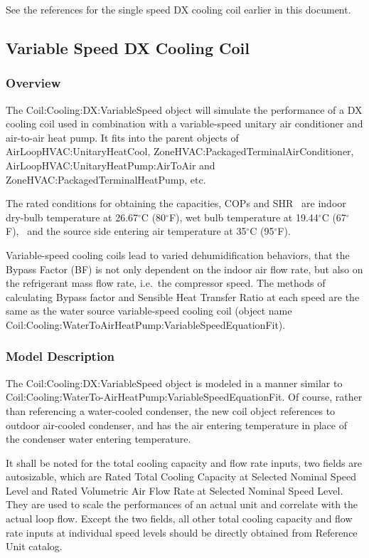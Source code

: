 See the references for the single speed DX cooling coil earlier in this document.

\subsection{Variable Speed DX Cooling Coil}\label{variable-speed-dx-cooling-coil}

\subsubsection{Overview}\label{overview-4-002}

The Coil:Cooling:DX:VariableSpeed object will simulate the performance of a DX cooling coil used in combination with a variable-speed unitary air conditioner and air-to-air heat pump. It fits into the parent objects of AirLoopHVAC:UnitaryHeatCool, ZoneHVAC:PackagedTerminalAirConditioner, AirLoopHVAC:UnitaryHeatPump:AirToAir and ZoneHVAC:PackagedTerminalHeatPump, etc.

The rated conditions for obtaining the capacities, COPs and SHR~ are indoor dry-bulb temperature at 26.67\(^{\circ}\)C (80\(^{\circ}\)F), wet bulb temperature at 19.44\(^{\circ}\)C (67\(^{\circ}\)F),~ and the source side entering air temperature at 35\(^{\circ}\)C (95\(^{\circ}\)F).

Variable-speed cooling coils lead to varied dehumidification behaviors, that the Bypass Factor (BF) is not only dependent on the indoor air flow rate, but also on the refrigerant mass flow rate, i.e.~the compressor speed. The methods of calculating Bypass factor and Sensible Heat Transfer Ratio at each speed are the same as the water source variable-speed cooling coil (object name Coil:Cooling:WaterToAirHeatPump:VariableSpeedEquationFit).

\subsubsection{Model Description}\label{model-description-3-003}

The Coil:Cooling:DX:VariableSpeed object is modeled in a manner similar to Coil:Cooling:WaterTo-AirHeatPump:VariableSpeedEquationFit. Of course, rather than referencing a water-cooled condenser, the new coil object references to outdoor air-cooled condenser, and has the air entering temperature in place of the condenser water entering temperature.

It shall be noted for the total cooling capacity and flow rate inputs, two fields are autosizable, which are Rated Total Cooling Capacity at Selected Nominal Speed Level and Rated Volumetric Air Flow Rate at Selected Nominal Speed Level. They are used to scale the performances of an actual unit and correlate with the actual loop flow. Except the two fields, all other total cooling capacity and flow rate inputs at individual speed levels should be directly obtained from Reference Unit catalog.

